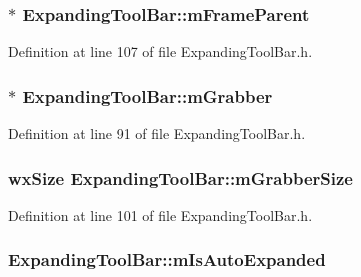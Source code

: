 \subsubsection[{\texorpdfstring{m\+Frame\+Parent}{mFrameParent}}]{$\ast$ Expanding\+Tool\+Bar\+::m\+Frame\+Parent\hspace{0.3cm}{\ttfamily [protected]}}\hypertarget{class_expanding_tool_bar_ab3f969637ce6c056c38a41be048832bd}{}\label{class_expanding_tool_bar_ab3f969637ce6c056c38a41be048832bd}


Definition at line 107 of file Expanding\+Tool\+Bar.\+h.

\subsubsection[{\texorpdfstring{m\+Grabber}{mGrabber}}]{$\ast$ Expanding\+Tool\+Bar\+::m\+Grabber\hspace{0.3cm}{\ttfamily [protected]}}\hypertarget{class_expanding_tool_bar_aa106c202a97c223e99ea76474a62d8e9}{}\label{class_expanding_tool_bar_aa106c202a97c223e99ea76474a62d8e9}


Definition at line 91 of file Expanding\+Tool\+Bar.\+h.

\subsubsection[{\texorpdfstring{m\+Grabber\+Size}{mGrabberSize}}]{\setlength{\rightskip}{0pt plus 5cm}wx\+Size Expanding\+Tool\+Bar\+::m\+Grabber\+Size\hspace{0.3cm}{\ttfamily [protected]}}\hypertarget{class_expanding_tool_bar_ae7f6393e15ef2b4b10406a7ab46fe93b}{}\label{class_expanding_tool_bar_ae7f6393e15ef2b4b10406a7ab46fe93b}


Definition at line 101 of file Expanding\+Tool\+Bar.\+h.

\subsubsection[{\texorpdfstring{m\+Is\+Auto\+Expanded}{mIsAutoExpanded}}]{ Expanding\+Tool\+Bar\+::m\+Is\+Auto\+Expanded\hspace{0.3cm}{\ttfamily [protected]}}\hypertarget{class_expanding_tool_bar_ad2ce29d98f22f0a5718cfc63cae5100c}{}\label{class_expanding_tool_bar_ad2ce29d98f22f0a5718cfc63cae5100c}


